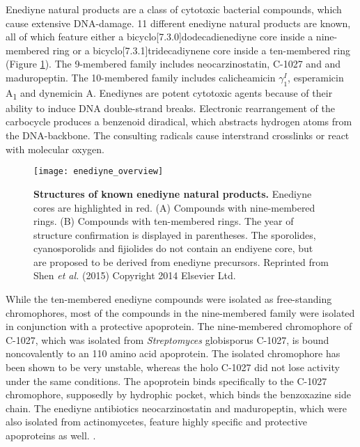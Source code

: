 	 Enediyne natural products are a class of cytotoxic bacterial compounds, which cause extensive DNA-damage.\autocite{Liang2010,Gredicak2007,AdrianL.Smith*1996,Nicolaou1993} 11 different enediyne natural products are known, all of which feature either a bicyclo[7.3.0]dodecadienediyne core inside a nine-membered ring or a bicyclo[7.3.1]tridecadiynene core inside a ten-membered ring (Figure \ref{fig:enediyne_comparison}). The 9-membered family includes neocarzinostatin, C-1027 and and maduropeptin. The 10-membered family includes calicheamicin $\gamma_{1}^{I}$, esperamicin A\textsubscript{1} and dynemicin A. \autocite{Liang2010} Enediynes are potent cytotoxic agents because of their ability to induce DNA double-strand breaks.\autocite{Shen2015} Electronic rearrangement of the carbocycle produces a benzenoid diradical, which abstracts hydrogen atoms from the DNA-backbone. The consulting radicals cause interstrand crosslinks or react with molecular oxygen.	 
	 \begin{figure}[htbp]
	 	\centering
	 	\texttt{[image: enediyne\_overview]}
	 	\caption[Structures of known enediyne natural products]{\textbf{Structures of known enediyne natural products.} Enediyne cores are highlighted in red. (A) Compounds with nine-membered rings. (B) Compounds with ten-membered rings. The year of structure confirmation is displayed in parentheses. The sporolides, cyanosporolids and fijiolides do not contain an endiyene core, but are proposed to be derived from enediyne precursors. Reprinted from Shen \textit{et al.} (2015) Copyright 2014 Elsevier Ltd.}
	 	\label{fig:enediyne_comparison}
	 \end{figure}
	 While the ten-membered enediyne compounds were isolated as free-standing chromophores, most of the compounds in the nine-membered family were isolated in conjunction with a protective apoprotein.\autocite{Liang2010} The nine-membered chromophore of C-1027, which was isolated from \textit{Streptomyces} globisporus C-1027, is bound noncovalently to an 110 amino acid apoprotein.\autocite{AdrianL.Smith*1996,Minami1993,Yoshida1993,Otani1993,Sugiura1993,Matsumoto1993,Otani1991,Otani1988a,Matsumoto1993a} The isolated chromophore has been shown to be very unstable, whereas the holo C-1027 did not lose activity under the same conditions. \autocite{Matsumoto1993,Sugiura1993,Otani1991} The apoprotein binds specifically to the C-1027 chromophore, supposedly by hydrophic pocket, which binds the benzoxazine side chain. \autocite{Okuno1994,Matsumoto1993} The enediyne antibiotics neocarzinostatin and maduropeptin, which were also isolated from actinomycetes, feature highly specific and protective apoproteins as well. \autocite{AdrianL.Smith*1996}.
	 
